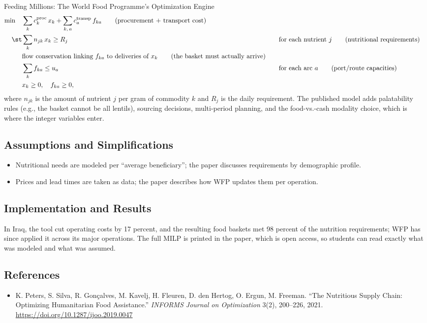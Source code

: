 \begin{casestudybox}{Feeding Millions: The World Food Programme's Optimization Engine}
\begin{align*}
\min \quad & \sum_{k} c^{\text{proc}}_k\, x_k + \sum_{k,\,a} c^{\text{transp}}_a\, f_{ka}   \tag{procurement + transport cost} \\
\st        & \sum_{k} n_{jk} \, x_k \geq R_j &&\quad \text{for each nutrient } j   \tag{nutritional requirements} \\
           & \text{flow conservation linking } f_{ka} \text{ to deliveries of } x_k   \tag{the basket must actually arrive} \\
           & \sum_{k} f_{ka} \leq u_a &&\quad \text{for each arc } a   \tag{port/route capacities} \\
           & x_k \geq 0, \quad f_{ka} \geq 0,
\end{align*}
where $n_{jk}$ is the amount of nutrient $j$ per gram of commodity $k$ and $R_j$ is the daily requirement.  The published model adds palatability rules (e.g., the basket cannot be all lentils), sourcing decisions, multi-period planning, and the food-vs.-cash modality choice, which is where the integer variables enter.

\subsection*{Assumptions and Simplifications}
\begin{itemize}
\item Nutritional needs are modeled per ``average beneficiary''; the paper discusses requirements by demographic profile.
\item Prices and lead times are taken as data; the paper describes how WFP updates them per operation.
\end{itemize}

\subsection*{Implementation and Results}
In Iraq, the tool cut operating costs by 17 percent, and the resulting food baskets met 98 percent of the nutrition requirements; WFP has since applied it across its major operations.  The full MILP is printed in the paper, which is open access, so students can read exactly what was modeled and what was assumed.

\subsection*{References}
\begin{itemize}
\item K. Peters, S. Silva, R. Gonçalves, M. Kavelj, H. Fleuren, D. den Hertog, O. Ergun, M. Freeman. ``The Nutritious Supply Chain: Optimizing Humanitarian Food Assistance.'' \emph{INFORMS Journal on Optimization} 3(2), 200--226, 2021. \url{https://doi.org/10.1287/ijoo.2019.0047}
\end{itemize}
\end{casestudybox}

